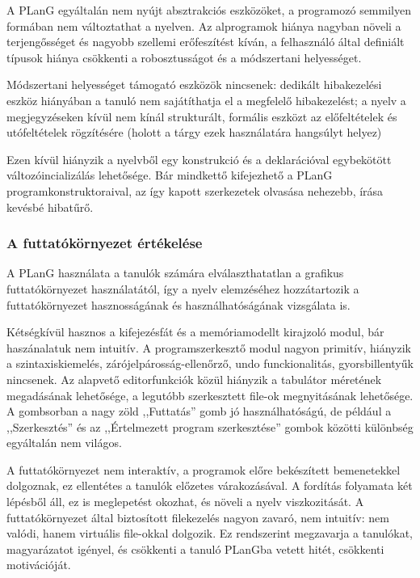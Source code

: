 A PLanG egyáltalán nem nyújt absztrakciós eszközöket, a programozó semmilyen formában nem változtathat a nyelven.
Az alprogramok hiánya nagyban növeli a terjengősséget és nagyobb szellemi erőfeszítést kíván, a felhasználó által definiált típusok hiánya csökkenti a robosztusságot és a módszertani helyességet.

Módszertani helyességet támogató eszközök nincsenek: dedikált hibakezelési eszköz hiányában a tanuló nem sajátíthatja el a megfelelő hibakezelést; a nyelv a megjegyzéseken kívül nem kínál strukturált, formális eszközt az előfeltételek és utófeltételek rögzítésére (holott a tárgy ezek használatára hangsúlyt helyez)

Ezen kívül hiányzik a nyelvből egy  konstrukció és a deklarációval egybekötött változóincializálás lehetősége. Bár mindkettő kifejezhető a PLanG programkonstruktoraival, az így kapott szerkezetek olvasása nehezebb, írása kevésbé hibatűrő.


\subsubsection{A futtatókörnyezet értékelése}
A PLanG használata a tanulók számára elválaszthatatlan a grafikus futtatókörnyezet használatától, így a nyelv elemzéséhez hozzátartozik a futtatókörnyezet hasznosságának és használhatóságának vizsgálata is.

Kétségkívül hasznos a kifejezésfát és a memóriamodellt kirajzoló modul, bár haszánalatuk nem intuitív.
A programszerkesztő modul nagyon primitív, hiányzik a szintaxiskiemelés, zárójelpárosság-ellenőrző, undo funckionalitás, gyorsbillentyűk nincsenek.
Az alapvető editorfunkciók közül hiányzik a tabulátor méretének megadásának lehetősége, a legutóbb szerkesztett file-ok megnyitásának lehetősége.
A gombsorban a nagy zöld ,,Futtatás'' gomb jó használhatóságú, de például a ,,Szerkesztés'' és az ,,Értelmezett program szerkesztése'' gombok közötti különbség egyáltalán nem világos.

A futtatókörnyezet nem interaktív, a programok előre bekészített bemenetekkel dolgoznak, ez ellentétes a tanulók előzetes várakozásával.
A fordítás folyamata két lépésből áll, ez is meglepetést okozhat, és növeli a nyelv viszkozitását.
A futtatókörnyezet által biztosított filekezelés nagyon zavaró, nem intuitív: nem valódi, hanem virtuális file-okkal dolgozik.
Ez rendszerint megzavarja a tanulókat, magyarázatot igényel, és csökkenti a tanuló PLanGba vetett hitét, csökkenti motivációját.


